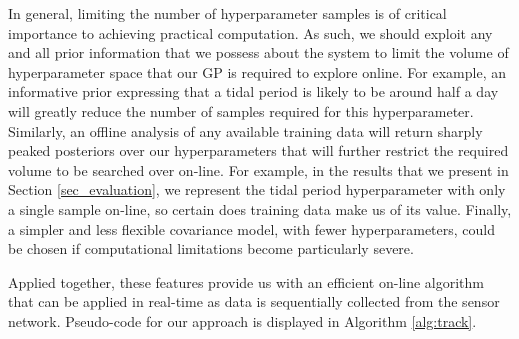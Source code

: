 \documentclass{acmtrans2m}
\begin{document}
In general, limiting the number of hyperparameter samples is of critical importance to achieving practical computation. As such, we should exploit any and all prior information that we possess about the system to limit the volume of hyperparameter space that our GP is required to explore online. For example, an informative prior expressing that a tidal period is likely to be around half a day will greatly reduce the number of samples required for this hyperparameter. Similarly, an offline analysis of any available training data will return sharply peaked posteriors over our hyperparameters that will further restrict the required volume to be searched over on-line. For example, in the results that we present in Section \ref{sec_evaluation}, we represent the tidal period hyperparameter with only a single sample on-line, so certain does training data make us of its value. Finally, a simpler and less flexible covariance model, with fewer hyperparameters, could be chosen if computational limitations become particularly severe. 

Applied together, these features provide us with an efficient on-line algorithm that can be applied in real-time as data is sequentially collected from the sensor network. Pseudo-code for our approach is displayed in Algorithm \ref{alg:track}.
\end{document}
